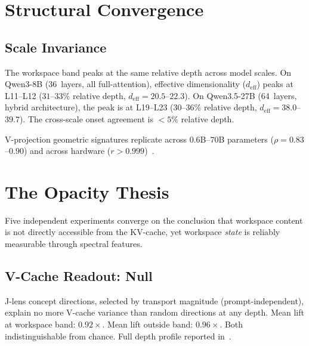 \documentclass[11pt,a4paper]{article}
\begin{document}
\section{Structural Convergence}
\label{sec:structure}

\subsection{Scale Invariance}

The workspace band peaks at the same relative depth across model
scales. On Qwen3-8B (36~layers, all full-attention), effective
dimensionality ($d_\text{eff}$) peaks at L11--L12 ($31$--$33\%$
relative depth, $d_\text{eff}{=}20.5$--$22.3$). On Qwen3.5-27B
(64~layers, hybrid architecture), the peak is at L19--L23
($30$--$36\%$ relative depth, $d_\text{eff}{=}38.0$--$39.7$).
The cross-scale onset agreement is $<5\%$ relative depth.

V-projection geometric signatures replicate across $0.6$B--$70$B
parameters ($\rho{=}0.83$--$0.90$) and across hardware
($r{>}0.999$)~\citep{lyra2026campaign2}.





\section{The Opacity Thesis}
\label{sec:opacity}

Five independent experiments converge on the conclusion that workspace
content is not directly accessible from the KV-cache, yet workspace
\emph{state} is reliably measurable through spectral features.

\subsection{V-Cache Readout: Null}

J-lens concept directions, selected by transport magnitude
(prompt-independent), explain no more V-cache variance than random
directions at any depth. Mean lift at workspace band: $0.92\times$.
Mean lift outside band: $0.96\times$. Both indistinguishable from
chance. Full depth profile reported in~\citep{lyra2026cache_tracing}.
\end{document}
